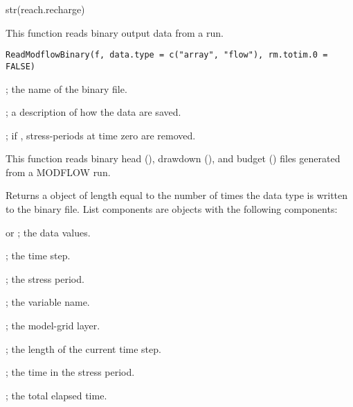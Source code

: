 \documentclass[letterpaper]{book}
\begin{document}
%
\begin{Examples}
\begin{ExampleCode}
str(reach.recharge)
\end{ExampleCode}
\end{Examples}
%
\begin{Description}\relax
This function reads binary output data from a  run.
\end{Description}
%
\begin{Usage}
\begin{verbatim}
ReadModflowBinary(f, data.type = c("array", "flow"), rm.totim.0 = FALSE)
\end{verbatim}
\end{Usage}
%
\begin{Arguments}
\begin{ldescription}
\item[\code{f}] ; the name of the binary file.
\item[\code{data.type}] ; a description of how the data are saved.
\item[\code{rm.totim.0}] ; if , stress-periods at time zero are removed.
\end{ldescription}
\end{Arguments}
%
\begin{Details}\relax
This function reads binary head (), drawdown (), and budget () files generated from a MODFLOW run.
\end{Details}
%
\begin{Value}
Returns a  object of length equal to the number of times the data type is written to the binary file.
List components are  objects with the following components:
\begin{ldescription}
\item[\code{d}]  or ; the data values.
\item[\code{kstp}] ; the time step.
\item[\code{kper}] ; the stress period.
\item[\code{desc}] ; the variable name.
\item[\code{ilay}] ; the model-grid layer.
\item[\code{delt}] ; the length of the current time step.
\item[\code{pertim}] ; the time in the stress period.
\item[\code{totim}] ; the total elapsed time.
\end{ldescription}
\end{Value}
\end{document}
